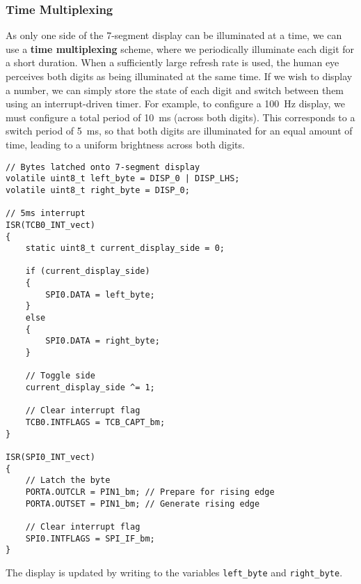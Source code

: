 \documentclass{article}
\begin{document}
\subsubsection{Time Multiplexing}
As only one side of the 7-segment display can be illuminated at a time,
we can use a \textbf{time multiplexing} scheme, where we periodically
illuminate each digit for a short duration. When a sufficiently large
refresh rate is used, the human eye perceives both digits as being
illuminated at the same time. If we wish to display a number, we can
simply store the state of each digit and switch between them using an
interrupt-driven timer.
For example, to configure a \qty{100}{\hertz} display, we must configure
a total period of \qty{10}{ms} (across both digits). This corresponds to
a switch period of \qty{5}{ms}, so that both digits are illuminated for
an equal amount of time, leading to a uniform brightness across both
digits.
\begin{verbatim}
// Bytes latched onto 7-segment display
volatile uint8_t left_byte = DISP_0 | DISP_LHS;
volatile uint8_t right_byte = DISP_0;

// 5ms interrupt
ISR(TCB0_INT_vect)
{
    static uint8_t current_display_side = 0;

    if (current_display_side)
    {
        SPI0.DATA = left_byte;
    }
    else
    {
        SPI0.DATA = right_byte;
    }

    // Toggle side
    current_display_side ^= 1;

    // Clear interrupt flag
    TCB0.INTFLAGS = TCB_CAPT_bm;
}

ISR(SPI0_INT_vect)
{
    // Latch the byte
    PORTA.OUTCLR = PIN1_bm; // Prepare for rising edge
    PORTA.OUTSET = PIN1_bm; // Generate rising edge

    // Clear interrupt flag
    SPI0.INTFLAGS = SPI_IF_bm;
}
\end{verbatim}
The display is updated by writing to the variables
\texttt{left_byte} and \texttt{right_byte}.
\end{document}
